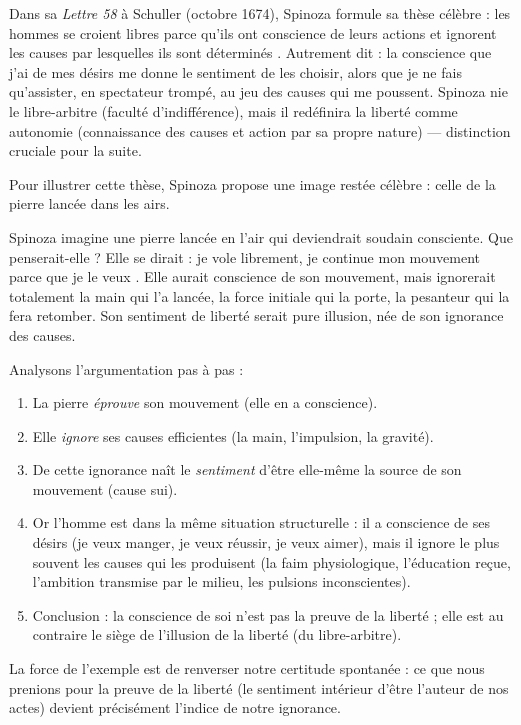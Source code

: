 \documentclass[11pt]{article}
\newcommand{\cle}[1]{{\popxbold\color{popdark}#1}}
\begin{document}
\begin{propriete}
Dans sa \emph{Lettre 58} à Schuller (octobre 1674), Spinoza formule sa thèse célèbre : \guillemotleft les hommes se croient libres parce qu'ils ont conscience de leurs actions et ignorent les causes par lesquelles ils sont déterminés \guillemotright. Autrement dit : la conscience que j'ai de mes désirs me donne le sentiment de les choisir, alors que je ne fais qu'assister, en spectateur trompé, au jeu des causes qui me poussent. Spinoza nie le \cle{libre-arbitre} (faculté d'indifférence), mais il redéfinira la \cle{liberté} comme \cle{autonomie} (connaissance des causes et action par sa propre nature) — distinction cruciale pour la suite.
\end{propriete}

Pour illustrer cette thèse, Spinoza propose une image restée célèbre : celle de la pierre lancée dans les airs.

\begin{experience}
Spinoza imagine une pierre lancée en l'air qui deviendrait soudain consciente. Que penserait-elle ? Elle se dirait : \guillemotleft je vole librement, je continue mon mouvement parce que je le veux \guillemotright. Elle aurait conscience de son mouvement, mais ignorerait totalement la main qui l'a lancée, la force initiale qui la porte, la pesanteur qui la fera retomber. Son sentiment de liberté serait pure illusion, née de son ignorance des causes.

Analysons l'argumentation pas à pas :
\begin{enumerate}
\item La pierre \emph{éprouve} son mouvement (elle en a conscience).
\item Elle \emph{ignore} ses causes efficientes (la main, l'impulsion, la gravité).
\item De cette ignorance naît le \emph{sentiment} d'être elle-même la source de son mouvement (cause sui).
\item Or l'homme est dans la même situation structurelle : il a conscience de ses désirs (je veux manger, je veux réussir, je veux aimer), mais il ignore le plus souvent les causes qui les produisent (la faim physiologique, l'éducation reçue, l'ambition transmise par le milieu, les pulsions inconscientes).
\item Conclusion : la conscience de soi n'est pas la preuve de la liberté ; elle est au contraire le siège de l'illusion de la liberté (du libre-arbitre).
\end{enumerate}
La force de l'exemple est de renverser notre certitude spontanée : ce que nous prenions pour la preuve de la liberté (le sentiment intérieur d'être l'auteur de nos actes) devient précisément l'indice de notre ignorance.
\end{experience}
\end{document}
